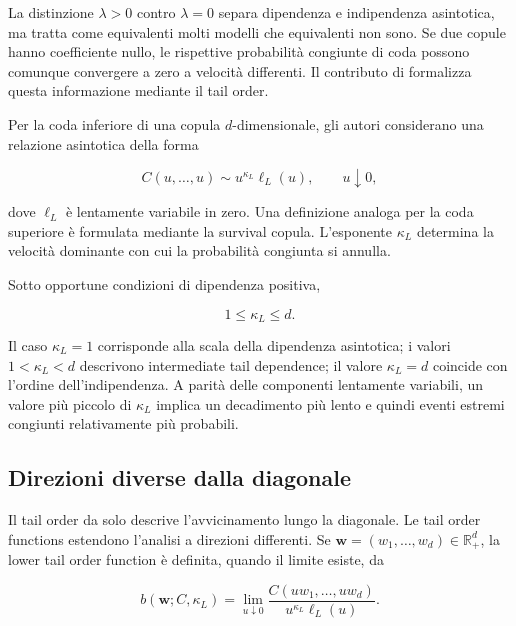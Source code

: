 La distinzione $\lambda>0$ contro $\lambda=0$ separa dipendenza e indipendenza
asintotica, ma tratta come equivalenti molti modelli che equivalenti non sono.
Se due copule hanno coefficiente nullo, le rispettive probabilità congiunte di
coda possono comunque convergere a zero a velocità differenti. Il contributo
di \textcite{huaJoe2011} formalizza questa informazione mediante il tail order.

Per la coda inferiore di una copula $d$-dimensionale, gli autori considerano
una relazione asintotica della forma

\begin{equation}
    C(u,\ldots,u)
    \sim u^{\kappa_L}\ell_L(u),
    \qquad u\downarrow 0,
    \label{eq:lower-tail-order}
\end{equation}

dove $\ell_L$ è lentamente variabile in zero. Una definizione analoga per la
coda superiore è formulata mediante la survival copula. L'esponente
$\kappa_L$ determina la velocità dominante con cui la probabilità congiunta
si annulla.

Sotto opportune condizioni di dipendenza positiva,

\begin{equation}
    1\leq \kappa_L\leq d.
\end{equation}

Il caso $\kappa_L=1$ corrisponde alla scala della dipendenza asintotica; i
valori $1<\kappa_L<d$ descrivono intermediate tail dependence; il valore
$\kappa_L=d$ coincide con l'ordine dell'indipendenza. A parità delle componenti
lentamente variabili, un valore più piccolo di $\kappa_L$ implica un
decadimento più lento e quindi eventi estremi congiunti relativamente più
probabili.

\subsection{Direzioni diverse dalla diagonale}

Il tail order da solo descrive l'avvicinamento lungo la diagonale. Le tail
order functions estendono l'analisi a direzioni differenti. Se
$\mathbf{w}=(w_1,\ldots,w_d)\in\mathbb{R}_+^d$, la lower tail order function è
definita, quando il limite esiste, da

\begin{equation}
    b(\mathbf{w};C,\kappa_L)
    =\lim_{u\downarrow0}
    \frac{C(uw_1,\ldots,uw_d)}
         {u^{\kappa_L}\ell_L(u)}.
    \label{eq:tail-order-function}
\end{equation}

